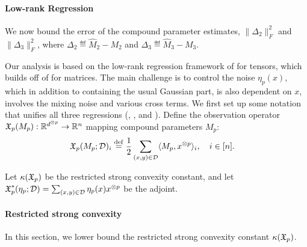 \paragraph{Low-rank Regression}
\vspace{-0.5em}
We now bound the error of
the compound parameter estimates,
$\|\Delta_2\|_F^2$ and $\|\Delta_3\|_F^2$,
where $\Delta_2 \eqdef \hat M_2 - M_2$
and $\Delta_3 \eqdef \hat M_3 - M_3$.

Our analysis is based on the low-rank regression framework of
\citet{Tomioka2011} for tensors, which builds off of
\citet{NegahbanWainwright2009} for matrices.
The main challenge is to control the noise $\eta_p(x)$,
which in addition to containing the usual Gaussian part, is also dependent on
$x$, involves the mixing noise and various cross terms.
We first set up some notation that unifies all three regressions (, , and ).
Define the observation operator $\operatorname{\mathfrak{X}}_p(M_p) : \mathbb{R}^{d^{\otimes p}} \to \mathbb{R}^{n}$
mapping compound parameters $M_p$:
\begin{align}
\operatorname{\mathfrak{X}}_p(M_p; \mathcal{D})_i &\stackrel{\rm def}{=} \frac12 \sum_{(x,y) \in \mathcal{D}} \langle M_p, x^{\otimes p} \rangle_i, \quad i  \in [n].
\end{align}

Let $\kappa(\operatorname{\mathfrak{X}}_p)$ be the restricted strong convexity constant,
and let $\operatorname{\mathfrak{X}}^*_p(\eta_p; \mathcal{D}) = \sum_{(x,y) \in \mathcal{D}} \eta_p(x) x^{\otimes p}$
be the adjoint.

\paragraph{Restricted strong convexity}

In this section, we lower bound the restricted strong convexity constant
$\kappa(\operatorname{\mathfrak{X}}_p)$.



